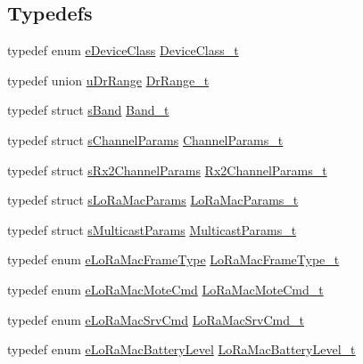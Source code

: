 \subsection*{Typedefs}
\begin{DoxyCompactItemize}
\item 
typedef enum \hyperlink{group__LORAMAC_ga133e92597739340bac439d1b0916dcb6}{e\+Device\+Class} \hyperlink{group__LORAMAC_ga29dc2e097802faaf8fbd0e18ff99695f}{Device\+Class\+\_\+t}
\item 
typedef union \hyperlink{unionuDrRange}{u\+Dr\+Range} \hyperlink{group__LORAMAC_ga8b818a36013d6bdd83ac5fd20f42b503}{Dr\+Range\+\_\+t}
\item 
typedef struct \hyperlink{structsBand}{s\+Band} \hyperlink{group__LORAMAC_ga8f49721ee96ceb52c80a896ab11a2ed8}{Band\+\_\+t}
\item 
typedef struct \hyperlink{structsChannelParams}{s\+Channel\+Params} \hyperlink{group__LORAMAC_ga1360ca6f82c6d125ea43a9dad9b56184}{Channel\+Params\+\_\+t}
\item 
typedef struct \hyperlink{structsRx2ChannelParams}{s\+Rx2\+Channel\+Params} \hyperlink{group__LORAMAC_ga8f57f29481ea92c24f6af04b96a95e0f}{Rx2\+Channel\+Params\+\_\+t}
\item 
typedef struct \hyperlink{structsLoRaMacParams}{s\+Lo\+Ra\+Mac\+Params} \hyperlink{group__LORAMAC_gad9c979008eadcd47b4d0f90bdae38b44}{Lo\+Ra\+Mac\+Params\+\_\+t}
\item 
typedef struct \hyperlink{structsMulticastParams}{s\+Multicast\+Params} \hyperlink{group__LORAMAC_ga02d2523505cac70954c043074087ea65}{Multicast\+Params\+\_\+t}
\item 
typedef enum \hyperlink{group__LORAMAC_ga5e02f214e1a4b8578c415045367c0a11}{e\+Lo\+Ra\+Mac\+Frame\+Type} \hyperlink{group__LORAMAC_ga3772acf0e9af9869ead480132e733cb2}{Lo\+Ra\+Mac\+Frame\+Type\+\_\+t}
\item 
typedef enum \hyperlink{group__LORAMAC_gaa56523d6cd76c438d6bc4263b5254d73}{e\+Lo\+Ra\+Mac\+Mote\+Cmd} \hyperlink{group__LORAMAC_ga7ef7dff520934ecc71835673f2acd015}{Lo\+Ra\+Mac\+Mote\+Cmd\+\_\+t}
\item 
typedef enum \hyperlink{group__LORAMAC_gac91cc4dc69ad7de2426360f9f1f2d079}{e\+Lo\+Ra\+Mac\+Srv\+Cmd} \hyperlink{group__LORAMAC_gabf2096aa70e466d0403f90200fab17b5}{Lo\+Ra\+Mac\+Srv\+Cmd\+\_\+t}
\item 
typedef enum \hyperlink{group__LORAMAC_gac7cbd1d9dc906cf2b33e3715cdd426c3}{e\+Lo\+Ra\+Mac\+Battery\+Level} \hyperlink{group__LORAMAC_ga05ad2aa3ef6de09ab289684a26901f75}{Lo\+Ra\+Mac\+Battery\+Level\+\_\+t}

\end{DoxyCompactItemize}
